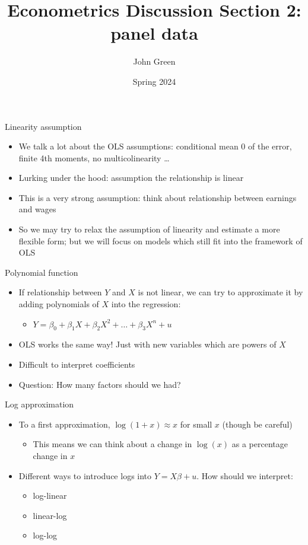 \documentclass[aspectratio=169]{beamer}
\title{Econometrics Discussion Section 2: panel data}
\author{John Green}
\date{Spring 2024}
\begin{document}
\begin{frame}
    \titlepage 
\end{frame}

\begin{frame}{Linearity assumption}
    \begin{itemize}
        \item We talk a lot about the OLS assumptions: conditional mean 0 of the error, finite 4th moments, no multicolinearity \dots
        \item Lurking under the hood: assumption the relationship is linear
        \item This is a very strong assumption: think about relationship between earnings and wages
        \item So we may try to relax the assumption of linearity and estimate a more flexible form; but we will focus on models which still fit into the framework of OLS
    \end{itemize}
\end{frame}

\begin{frame}{Polynomial function}
    \begin{itemize}
        \item If relationship between $Y$ and $X$ is not linear, we can try to approximate it by adding polynomials of $X$ into the regression: 
        \begin{itemize}
            \item $Y = \beta_0 + \beta_1 X + \beta_2 X^2 + \dots + \beta_3 X^n + u$
        \end{itemize}
        \item OLS works the same way! Just with new variables which are powers of $X$
        \item Difficult to interpret coefficients
        \item Question: How many factors should we had?
    \end{itemize}
\end{frame}

\begin{frame}{Log approximation}
    \begin{itemize}
        \item To a first approximation, $\log(1+x) \approx x$ for small $x$ (though be careful)
        \begin{itemize}
            \item This means we can think about a change in $\log(x)$ as a percentage change in $x$
        \end{itemize}
        \item Different ways to introduce logs into $Y=X\beta + u$. How should we interpret:
        \begin{itemize}
            \item log-linear
            \item linear-log
            \item log-log
        \end{itemize}
    \end{itemize}
\end{frame}
\end{document}
